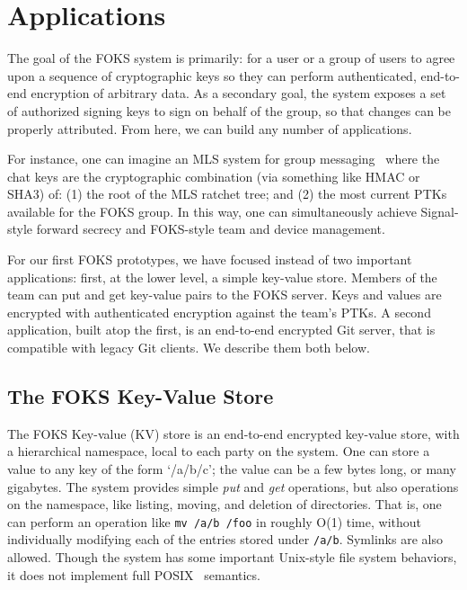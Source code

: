 
\section{Applications}
\label{sec:apps}

The goal of the FOKS system is primarily: for a user or a group of users to
agree upon a sequence of cryptographic keys so they can perform authenticated,
end-to-end encryption of arbitrary data. As a secondary goal, the system
exposes a set of authorized signing keys to sign on behalf of the group,
so that changes can be properly attributed. From here, we can build
any number of applications. 

For instance, one can imagine an MLS system for group messaging~\cite{MLS} where
the chat keys are the cryptographic combination (via something like HMAC or
SHA3) of: (1) the root of the MLS ratchet tree; and (2) the most current PTKs
available for the FOKS group. In this way, one can simultaneously achieve
Signal-style forward secrecy and FOKS-style team and device management. 

For our first FOKS prototypes, we have focused instead of two important applications:
first, at the lower level, a simple key-value store. Members of the team
can put and get key-value pairs to the FOKS server. Keys and values are encrypted
with authenticated encryption against the team's PTKs. A second application, built
atop the first, is an end-to-end encrypted Git server, that is compatible with
legacy Git clients. We describe them both below.

\subsection{The FOKS Key-Value Store}

The FOKS Key-value (KV) store is an end-to-end encrypted key-value store, with 
a hierarchical namespace, local to each party on the system. One can store a value
to any key of the form `/a/b/c'; the value can be a few bytes long, or many gigabytes.
The system provides simple \textit{put} and \textit{get} operations, but also
operations on the namespace, like listing, moving, and deletion of directories. That is,
one can perform an operation like \texttt{mv /a/b /foo} in roughly O(1) time, without
individually modifying each of the entries stored under \texttt{/a/b}. Symlinks are also 
allowed. Though the system has some important Unix-style file system behaviors,
it does not implement full POSIX~\cite{posix-2017} semantics.

